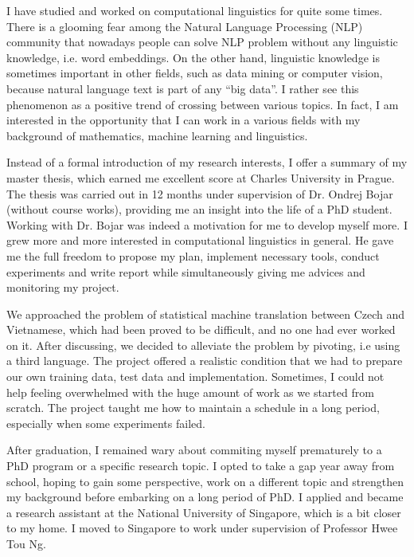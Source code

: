 \documentclass[a4paper, 12pt]{scrartcl}
\begin{document}

I have studied and worked on computational linguistics for quite some times. 
There is a glooming fear among the Natural Language Processing (NLP) community that nowadays people can solve NLP problem without any linguistic knowledge, i.e. word embeddings.
On the other hand, linguistic knowledge is sometimes important in other fields, such as data mining or computer vision, because natural language text is part of any ``big data''. 
I rather see this phenomenon as a positive trend of crossing between various topics. 
In fact, I am interested in the opportunity that I can work in a various fields with my background of mathematics, machine learning and linguistics. 


Instead of a formal introduction of my research interests, I offer a summary of my master thesis, which earned me excellent score at Charles University in Prague. 
The thesis was carried out in 12 months under supervision of Dr. Ondrej Bojar (without course works), providing me an insight into the life of a PhD student.
Working with Dr. Bojar was indeed a motivation for me to develop myself more. I grew more and more interested in computational linguistics in general. 
He gave me the full freedom to propose my plan, implement necessary tools, conduct experiments and write report while simultaneously giving me advices and monitoring my project. 

We approached the problem of statistical machine translation between Czech and Vietnamese, which had been proved to be difficult, and no one had ever worked on it.
After discussing, we decided to alleviate the problem by pivoting, i.e using a third language. 
The project offered a realistic condition that we had to prepare our own training data, test data and implementation.
Sometimes, I could not help feeling overwhelmed with the huge amount of work as we started from scratch.
The project taught me how to maintain a schedule in a long period, especially when some experiments failed.



After graduation, I remained wary about commiting myself prematurely to a PhD program or a specific research topic. 
I opted to take a gap year away from school, hoping to gain some perspective, work on a different topic and strengthen my background before embarking on a long period of PhD.
I applied and became a research assistant at the National University of Singapore, which is a bit closer to my home.
I moved to Singapore to work under supervision of Professor Hwee Tou Ng.  
\end{document}
